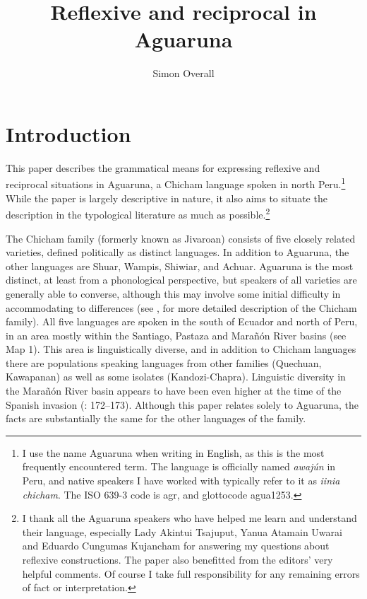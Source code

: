 \documentclass[output=paper]{langscibook}
\author{Simon Overall\affiliation{University of Otago}}
\title{Reflexive and reciprocal in Aguaruna}
\begin{document}
\maketitle


\section{Introduction} %
\label{sec:overall:1}

This paper describes the grammatical means for expressing %
reflexive and reciprocal situations in Aguaruna, a Chicham language spoken in north Peru.\footnote{I use the name Aguaruna when writing in English, as this is the most frequently encountered term. The language is officially named \textit{awajún} in Peru, and native speakers I have worked with typically refer to it as \textit{iinia chicham}. The ISO 639-3 code is agr, and glottocode agua1253.} While the paper is largely descriptive in nature, it also aims to situate the description in the typological literature as much as possible.\footnote{I thank all the Aguaruna speakers who have helped me learn and understand their language, especially Lady Akintui Tsajuput, Yanua Atamain Uwarai and Eduardo Cungumas Kujancham for answering my questions about reflexive constructions. The paper also benefitted from the editors’ very helpful comments. Of course I take full responsibility for any remaining errors of fact or interpretation.}

The Chicham family (formerly known as Jivaroan) consists of five closely related varieties, defined politically as distinct languages. In addition to Aguaruna, the other languages are Shuar, Wampis, Shiwiar, and Achuar. Aguaruna is the most distinct, at least from a phonological perspective, but speakers of all varieties are generally able to converse, although this may involve some initial difficulty in accommodating to differences (see \citep{OverallKohlbergerinprep}, for more detailed description of the Chicham family). All five languages are spoken in the south of Ecuador and north of Peru, in an area mostly within the Santiago, Pastaza and Marañón River basins (see Map 1). This area is linguistically diverse, and in addition to Chicham languages there are populations speaking languages from other families (Quechuan, Kawapanan) as well as some isolates (Kandozi-Chapra). Linguistic diversity in the Marañón River basin appears to have been even higher at the time of the Spanish invasion (\citealt{AdelaarMuysken2004}: 172–173). Although this paper relates solely to Aguaruna, the facts are substantially the same for the other languages of the
family.
\end{document}
